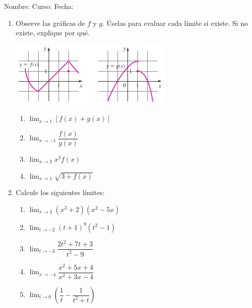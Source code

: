 \documentclass[letterpaper,fleqn]{article}
\newcommand{\LineaNombre}{%
\par
\vspace{\baselineskip}
Nombre:\hrulefill \; Curso: \underline{\hspace*{48pt}} \; Fecha: \underline{\hspace*{2.5cm}} \relax
\par}
\begin{document}
\LineaNombre
\begin{enumerate}
 \item Observe las gráficas de $f$ y $g$. Úselas para evaluar cada límite si existe. Si no existe, explique por qué.
\begin{center}
\includegraphics[scale=.8]{Images/funciones_fyg.png} 
\end{center}
\begin{enumerate}
\item $\displaystyle{\lim_{x\rightarrow 1}}[f(x)+g(x)]$\noanswer
\item $\displaystyle{\lim_{x\rightarrow -1}}\dfrac{f(x)}{g(x)}$\noanswer
\item $\displaystyle{\lim_{x\rightarrow 2}}x^{3}f(x)$\noanswer
\item $\displaystyle{\lim_{x\rightarrow 1}}\sqrt{3+f(x)}$\noanswer
\end{enumerate}
\item Calcule los siguientes límites:
\begin{enumerate}
\item $\displaystyle{\lim_{x\rightarrow 3}}(x^{3}+2)(x^{2}-5x)$ \noanswer
\newpage
\item $\displaystyle{\lim_{t\rightarrow -2}}(t+1)^{9}(t^{2}-1)$\noanswer
\item $\displaystyle{\lim_{t\rightarrow -3}}\dfrac{2t^{2}+7t+3}{t^{2}-9}$\noanswer
\item $\displaystyle{\lim_{x\rightarrow -4}}\dfrac{x^{2}+5x+4}{x^{2}+3x-4}$\noanswer
\item $\displaystyle{\lim_{t\rightarrow 0}}\left(\dfrac{1}{t}-\dfrac{1}{t^{2}+t}\right)$\noanswer
\end{enumerate}
 \end{enumerate}
\end{document}
